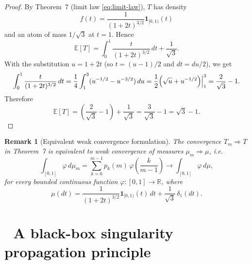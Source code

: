 \documentclass[11pt]{article}
\newtheorem{remark}{Remark}
\begin{document}
\begin{proof}
By Theorem~7 (limit law \eqref{eq:limit-law}), $T$ has density
\[
f(t)=\frac{1}{(1+2t)^{3/2}}\mathbf 1_{[0,1)}(t)
\]
and an atom of mass $1/\sqrt3$ at $t=1$. Hence
\[
\mathbb{E}[T]=\int_0^1 \frac{t}{(1+2t)^{3/2}}\,dt+\frac{1}{\sqrt3}.
\]
With the substitution $u=1+2t$ (so $t=(u-1)/2$ and $dt=du/2$), we get
\[
\int_0^1 \frac{t}{(1+2t)^{3/2}}\,dt
=\frac14\int_1^3 (u^{-1/2}-u^{-3/2})\,du
=\frac12\Bigl(\sqrt{u}+u^{-1/2}\Bigr)\Big|_{1}^{3}
=\frac{2}{\sqrt3}-1.
\]
Therefore
\[
\mathbb{E}[T]=\left(\frac{2}{\sqrt3}-1\right)+\frac{1}{\sqrt3}
=\frac{3}{\sqrt3}-1
=\sqrt3-1.
\]
\end{proof}


\begin{remark}[Equivalent weak convergence formulation]
The convergence $T_m \Rightarrow T$ in Theorem~7 is equivalent to weak convergence of
measures $\mu_m \Rightarrow \mu$, i.e.
\[
\int_{[0,1]} \varphi\, d\mu_m
=\sum_{k=0}^{m-1} p_k(m)\,\varphi\!\left(\frac{k}{m-1}\right)
\longrightarrow
\int_{[0,1]} \varphi\, d\mu,
\]
for every bounded continuous function $\varphi:[0,1]\to\mathbb{R}$, where
\[
\mu(dt)=\frac{1}{(1+2t)^{3/2}}\mathbf 1_{[0,1)}(t)\,dt+\frac{1}{\sqrt3}\,\delta_1(dt).
\]
\end{remark}


\section{  $\;$ A black-box singularity propagation principle}\label{app:blackbox}
\end{document}
